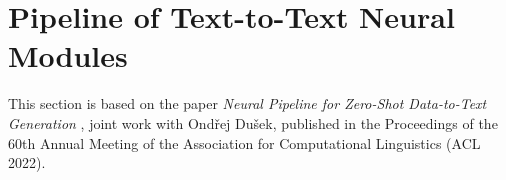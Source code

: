 





\section{Pipeline of Text-to-Text Neural Modules}
\label{sec:pipeline}
\begin{refbox}
    This section is based on the paper \emph{Neural Pipeline for Zero-Shot Data-to-Text Generation} \cite{kasner2022neural}, joint work with Ondřej Dušek, published in the Proceedings of the 60th Annual Meeting of the Association for Computational Linguistics (ACL 2022).
\end{refbox}

